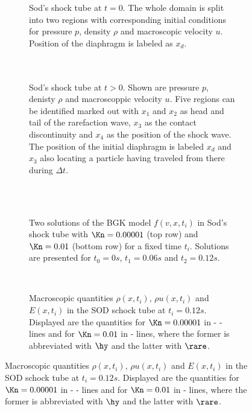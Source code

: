 \begin{figure}[H]
	\begin{subfigure}{.45\textwidth}
		\centering
		
		\caption{Sod's shock tube at \(t=0\). The whole domain is split into two regions with corresponding initial conditions for pressure \(p\), density \(\rho\) and macroscopic velocity \(u\). Position of the diaphragm is labeled as \(x_d\).\\ \\ \\}
		\label{Fig:SodTime}
	\end{subfigure}\hfill
	\begin{subfigure}{.45\textwidth}
		\centering
		
		\caption{Sod's shock tube at \(t>0\). Shown are pressure \(p\), denisty \(\rho\)  and macroscoppic velocity \(u\). Five regions can be identified marked out with \(x_1\) and \(x_2\) as head and tail of the rarefaction wave, \(x_3\) as the contact discontinuity and \(x_4\) as the position of the shock wave. The position of the initial diaphragm is labeled \(x_d\) and \(x_3\) also locating a particle having traveled from there during \(\Delta t\).}
		\label{Fig:SodTime0}
	\end{subfigure}\\ \\ \vfill
	\begin{subfigure}{\textwidth}
		\centering
		
		\caption{Two solutions of the BGK model \(f(v,x,t_i)\) in Sod's shock tube with \(\Kn=0.00001\) (top row) and \(\Kn=0.01\) (bottom row) for a fixed time \(t_i\). Solutions are presented for \(t_0=0s\), \(t_1=0.06s\) and \(t_2=0.12s\).}
		\label{Fig:ExamplesSod}
	\end{subfigure}\\
	\begin{subfigure}{\textwidth}
		
		\caption{Macroscopic quantities \(\rho(x,t_i)\), \(\rho u(x,t_i)\) and \(E(x,t_i)\) in the SOD schock tube at \(t_i=0.12s\). Displayed are the quantities for \(\Kn=0.00001\)  in - - lines and for \(\Kn=0.01\) in - lines, where the former is abbreviated with \(\hy\) and the latter with \(\rare\).}
	\end{subfigure}
\end{figure}

%	

